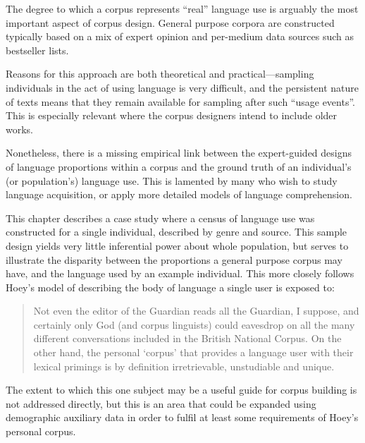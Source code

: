 The degree to which a corpus represents ``real'' language use is arguably the most important aspect of corpus design.  General purpose corpora are constructed typically based on a mix of expert opinion and per-medium data sources such as bestseller lists.


Reasons for this approach are both theoretical and practical---sampling individuals in the act of using language is very difficult, and the persistent nature of texts means that they remain available for sampling after such ``usage events''.  This is especially relevant where the corpus designers intend to include older works.

Nonetheless, there is a missing empirical link between the expert-guided designs of language proportions within a corpus and the ground truth of an individual's (or population's) language use.  This is lamented by many who wish to study language acquisition, or apply more detailed models of language comprehension.

This chapter describes a case study where a census of language use was constructed for a single individual, described by genre and source.  This sample design yields very little inferential power about whole population, but serves to illustrate the disparity between the proportions a general purpose corpus may have, and the language used by an example individual.  This more closely follows Hoey's \cite{hoey2005lexical} model of describing the body of language a single user is exposed to:

\begin{quote}
Not even the editor of the Guardian reads all the Guardian, I suppose, and certainly only God (and corpus linguists) could eavesdrop on all the many different conversations included in the British National Corpus.  On the other hand, the personal `corpus' that provides a language user with their lexical primings is by definition irretrievable, unstudiable and unique.
\end{quote}

The extent to which this one subject may be a useful guide for corpus building is not addressed directly, but this is an area that could be expanded using demographic auxiliary data in order to fulfil at least some requirements of Hoey's personal corpus.

